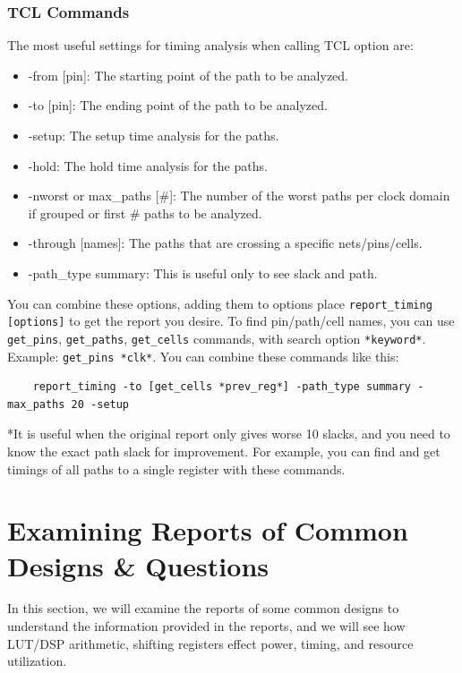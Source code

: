 \documentclass{report}
\begin{document}
\subsection{TCL Commands}
The most useful settings for timing analysis when calling TCL option are:
\begin{itemize} 
    \item -from [pin]: The starting point of the path to be analyzed.
    \item -to [pin]: The ending point of the path to be analyzed.
    \item -setup: The setup time analysis for the paths.
    \item -hold: The hold time analysis for the paths.
    \item -nworst or max\_paths [\#]: The number of the worst paths per clock domain if grouped or first \# paths to be analyzed.
    \item -through [names]: The paths that are crossing a specific nets/pins/cells.
    \item -path\_type summary: This is useful only to see slack and path.
\end{itemize}

You can combine these options, adding them to options place \texttt{report\_timing [options]} to get the report you desire. 
To find pin/path/cell names, you can use \texttt{get\_pins}, \texttt{get\_paths}, \texttt{get\_cells} commands, with search option \texttt{*keyword*}. Example: \texttt{get\_pins *clk*}.
You can combine these commands like this:
\begin{verbatim}
    report_timing -to [get_cells *prev_reg*] -path_type summary -max_paths 20 -setup
\end{verbatim}
*It is useful when the original report only gives worse 10 slacks, and you need to know the exact path slack for improvement. For example, you can find and get timings of all paths to a single register with these commands.

\chapter{Examining Reports of Common Designs \& Questions}
In this section, we will examine the reports of some common designs to understand the information provided in the reports, and we will see how LUT/DSP arithmetic, shifting registers effect power, timing, and resource utilization.

\end{document}
